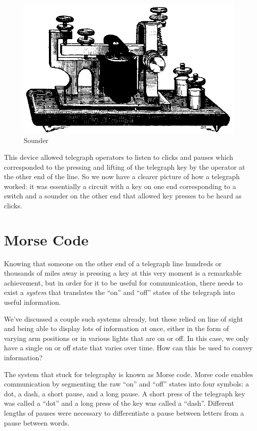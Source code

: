 \documentclass[UTF8]{book}
\begin{document}
\begin{CJK}{UTF8}{gbsn}
\begin{figure}[H]
\centering
\includegraphics[width=0.8\linewidth]{telegraphsounder}
\caption{Sounder}
\end{figure}


This device allowed telegraph operators to listen to clicks and pauses which corresponded to the pressing and lifting of the telegraph key by the operator at the other end of the line. So we now have a clearer picture of how a telegraph worked: it was essentially a circuit with a key on one end corresponding to a switch and a sounder on the other end that allowed key presses to be heard as clicks.

\section{Morse Code}

Knowing that someone on the other end of a telegraph line hundreds or thousands of miles away is pressing a key at this very moment is a remarkable achievement, but in order for it to be useful for communication, there needs to exist a \emph{system} that translates the ``on'' and ``off'' states of the telegraph into useful information.

We've discussed a couple such systems already, but these relied on line of sight and being able to display lots of information at once, either in the form of varying arm positions or in various lights that are on or off. In this case, we only have a single on or off state that varies over time. How can this be used to convey information?

The system that stuck for telegraphy is known as Morse code. Morse code enables communication by segmenting the raw ``on'' and ``off'' states into four symbols: a dot, a dash, a short pause, and a long pause. A short press of the telegraph key was called a ``dot'' and a long press of the key was called a ``dash''. Different lengths of pauses were necessary to differentiate a pause between letters from a pause between words.


\end{CJK}
\end{document}
